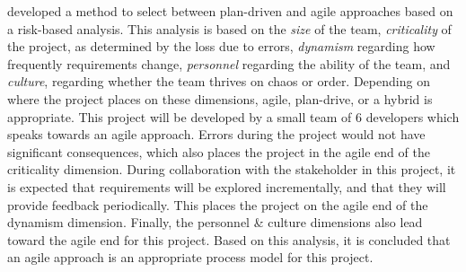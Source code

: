 developed a method to select between plan-driven and agile approaches based on a risk-based analysis.
This analysis is based on the \textit{size} of the team, \textit{criticality} of the project, as determined by the loss due to errors, \textit{dynamism} regarding how frequently requirements change, \textit{personnel} regarding the ability of the team, and \textit{culture}, regarding whether the team thrives on chaos or order. Depending on where the project places on these dimensions, agile, plan-drive, or a hybrid is appropriate.
This project will be developed by a small team of 6 developers which speaks towards an agile approach. 
Errors during the project would not have significant consequences, which also places the project in the agile end of the criticality dimension.
During collaboration with the stakeholder in this project, it is expected that requirements will be explored incrementally, and that they will provide feedback periodically. This places the project on the agile end of the dynamism dimension.
Finally, the personnel \& culture dimensions also lead toward the agile end for this project.\cite{boehmObservationsBalancingDiscipline}
Based on this analysis, it is concluded that an agile approach is an appropriate process model for this project.

